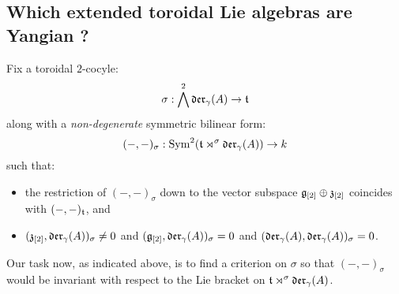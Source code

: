     \subsection{Which extended toroidal Lie algebras are Yangian ?}
        Fix a toroidal $2$-cocyle:
            $$\sigma: \bigwedge^2 \mathfrak{der}_{\gamma}(A) \to \mathfrak{t}$$
        along with a \textit{non-degenerate} symmetric bilinear form:
            $$(-, -)_{\sigma}: \mathrm{Sym}^2( \mathfrak{t} \rtimes^{\sigma} \mathfrak{der}_{\gamma}(A) ) \to k$$
        such that:
        \begin{itemize}
            \item the restriction of $(-, -)_{\sigma}$ down to the vector subspace $\mathfrak{g}_{[2]} \oplus \mathfrak{z}_{[2]}$ coincides with $(-, -)_{\mathfrak{t}}$, and
            \item $(\mathfrak{z}_{[2]}, \mathfrak{der}_{\gamma}(A))_{\sigma} \not = 0$ and $(\mathfrak{g}_{[2]}, \mathfrak{der}_{\gamma}(A))_{\sigma} = 0$ and $(\mathfrak{der}_{\gamma}(A), \mathfrak{der}_{\gamma}(A))_{\sigma} = 0$.
        \end{itemize}
        Our task now, as indicated above, is to find a criterion on $\sigma$ so that $(-, -)_{\sigma}$ would be invariant with respect to the Lie bracket on $\mathfrak{t} \rtimes^{\sigma} \mathfrak{der}_{\gamma}(A)$.
        
